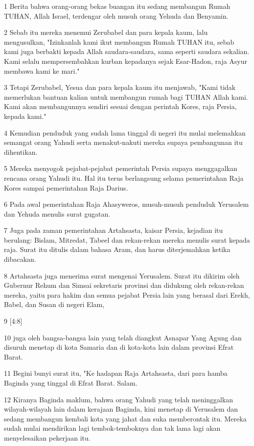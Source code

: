 \par 1 Berita bahwa orang-orang bekas buangan itu sedang membangun Rumah TUHAN, Allah Israel, terdengar oleh musuh orang Yehuda dan Benyamin.
\par 2 Sebab itu mereka menemui Zerubabel dan para kepala kaum, lalu mengusulkan, "Izinkanlah kami ikut membangun Rumah TUHAN itu, sebab kami juga berbakti kepada Allah saudara-saudara, sama seperti saudara sekalian. Kami selalu mempersembahkan kurban kepadanya sejak Esar-Hadon, raja Asyur membawa kami ke mari."
\par 3 Tetapi Zerubabel, Yesua dan para kepala kaum itu menjawab, "Kami tidak memerlukan bantuan kalian untuk membangun rumah bagi TUHAN Allah kami. Kami akan membangunnya sendiri sesuai dengan perintah Kores, raja Persia, kepada kami."
\par 4 Kemudian penduduk yang sudah lama tinggal di negeri itu mulai melemahkan semangat orang Yahudi serta menakut-nakuti mereka supaya pembangunan itu dihentikan.
\par 5 Mereka menyogok pejabat-pejabat pemerintah Persia supaya menggagalkan rencana orang Yahudi itu. Hal itu terus berlangsung selama pemerintahan Raja Kores sampai pemerintahan Raja Darius.
\par 6 Pada awal pemerintahan Raja Ahasyweros, musuh-musuh penduduk Yerusalem dan Yehuda menulis surat gugatan.
\par 7 Juga pada zaman pemerintahan Artahsasta, kaisar Persia, kejadian itu berulang: Bislam, Mitredat, Tabeel dan rekan-rekan mereka menulis surat kepada raja. Surat itu ditulis dalam bahasa Aram, dan harus diterjemahkan ketika dibacakan.
\par 8 Artahsasta juga menerima surat mengenai Yerusalem. Surat itu dikirim oleh Gubernur Rehum dan Simsai sekretaris provinsi dan didukung oleh rekan-rekan mereka, yaitu para hakim dan semua pejabat Persia lain yang berasal dari Erekh, Babel, dan Susan di negeri Elam,
\par 9 [4:8]
\par 10 juga oleh bangsa-bangsa lain yang telah diangkut Asnapar Yang Agung dan disuruh menetap di kota Samaria dan di kota-kota lain dalam provinsi Efrat Barat.
\par 11 Begini bunyi surat itu, "Ke hadapan Raja Artahsasta, dari para hamba Baginda yang tinggal di Efrat Barat. Salam.
\par 12 Kiranya Baginda maklum, bahwa orang Yahudi yang telah meninggalkan wilayah-wilayah lain dalam kerajaan Baginda, kini menetap di Yerusalem dan sedang membangun kembali kota yang jahat dan suka memberontak itu. Mereka sudah mulai mendirikan lagi tembok-temboknya dan tak lama lagi akan menyelesaikan pekerjaan itu.
